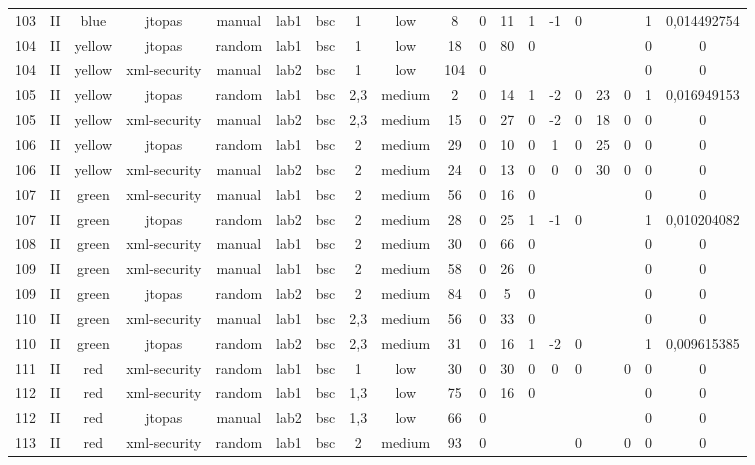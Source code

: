 \begin{table}[ht]
\begin{tabular}{c c c c c c c c c c c c c c c c c c c}
\\103 & II & blue & jtopas & manual & lab1 & bsc & 1 & low & 8 & 0 & 11 & 1 & -1 & 0 &  &  & 1 & 0,014492754
\\104 & II & yellow & jtopas & random & lab1 & bsc & 1 & low & 18 & 0 & 80 & 0 &  &  &  &  & 0 & 0
\\104 & II & yellow & xml-security & manual & lab2 & bsc & 1 & low & 104 & 0 &  &  &  &  &  &  & 0 & 0
\\105 & II & yellow & jtopas & random & lab1 & bsc & 2,3 & medium & 2 & 0 & 14 & 1 & -2 & 0 & 23 & 0 & 1 & 0,016949153
\\105 & II & yellow & xml-security & manual & lab2 & bsc & 2,3 & medium & 15 & 0 & 27 & 0 & -2 & 0 & 18 & 0 & 0 & 0
\\106 & II & yellow & jtopas & random & lab1 & bsc & 2 & medium & 29 & 0 & 10 & 0 & 1 & 0 & 25 & 0 & 0 & 0
\\106 & II & yellow & xml-security & manual & lab2 & bsc & 2 & medium & 24 & 0 & 13 & 0 & 0 & 0 & 30 & 0 & 0 & 0
\\107 & II & green & xml-security & manual & lab1 & bsc & 2 & medium & 56 & 0 & 16 & 0 &  &  &  &  & 0 & 0
\\107 & II & green & jtopas & random & lab2 & bsc & 2 & medium & 28 & 0 & 25 & 1 & -1 & 0 &  &  & 1 & 0,010204082
\\108 & II & green & xml-security & manual & lab1 & bsc & 2 & medium & 30 & 0 & 66 & 0 &  &  &  &  & 0 & 0
\\109 & II & green & xml-security & manual & lab1 & bsc & 2 & medium & 58 & 0 & 26 & 0 &  &  &  &  & 0 & 0
\\109 & II & green & jtopas & random & lab2 & bsc & 2 & medium & 84 & 0 & 5 & 0 &  &  &  &  & 0 & 0
\\110 & II & green & xml-security & manual & lab1 & bsc & 2,3 & medium & 56 & 0 & 33 & 0 &  &  &  &  & 0 & 0
\\110 & II & green & jtopas & random & lab2 & bsc & 2,3 & medium & 31 & 0 & 16 & 1 & -2 & 0 &  &  & 1 & 0,009615385
\\111 & II & red & xml-security & random & lab1 & bsc & 1 & low & 30 & 0 & 30 & 0 & 0 & 0 &  & 0 & 0 & 0
\\112 & II & red & xml-security & random & lab1 & bsc & 1,3 & low & 75 & 0 & 16 & 0 &  &  &  &  & 0 & 0
\\112 & II & red & jtopas & manual & lab2 & bsc & 1,3 & low & 66 & 0 &  &  &  &  &  &  & 0 & 0
\\113 & II & red & xml-security & random & lab1 & bsc & 2 & medium & 93 & 0 &  &  &  & 0 &  & 0 & 0 & 0

\end{tabular}
\end{table}
